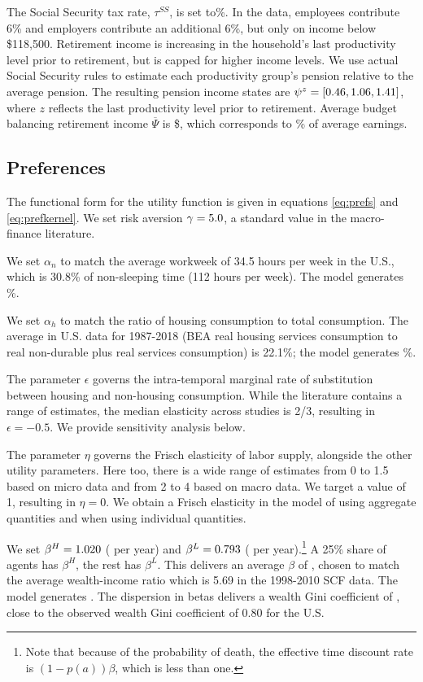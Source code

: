 \documentclass[letterpaper,12pt,dvipsnames,usenames]{article}
\theoremstyle{definition}
\begin{document}
\begin{spacing}{1.25}
The Social Security tax rate, $\tau^{SS}$, is set to{\taxssper}\%. In the data, employees contribute 6\% and employers contribute an additional 6\%, but only on income below \$118,500. Retirement income is increasing in the household's last productivity level prior to retirement, but is capped for higher income levels.  We use actual Social Security rules to estimate each productivity group's pension relative to the average pension.  The resulting pension income states are $\psi^{z}= [{0.46},{1.06},{1.41}]$, where $z$ reflects the last productivity level prior to retirement. Average budget balancing retirement income $\overline{\Psi}$ is \${\RetInc}, which corresponds to {\RetIncbyLabInc}\% of average earnings.



\subsection{Preferences}
The functional form for the utility function is given in equations \eqref{eq:prefs} and \eqref{eq:prefkernel}. We set risk aversion $\gamma={5.0}$, a standard value in the macro-finance literature.

We set $\alpha_{n}$ to match the average workweek of 34.5 hours per week in the U.S., which is 30.8\% of non-sleeping time (112 hours per week).
The model generates {\AvgHours} \%.

We set $\alpha_{h}$ to match the ratio of housing consumption to total consumption. The average in U.S. data for 1987-2018 (BEA real housing services consumption to real non-durable plus real services consumption) is 22.1\%; the model generates {\HousTotConsratio}\%.

The parameter $\epsilon$ governs the intra-temporal marginal rate of substitution between housing and non-housing consumption. While the literature contains a range of estimates, the median elasticity across studies is 2/3, resulting in $\epsilon=-0.5$. We provide sensitivity analysis below.

The parameter $\eta$ governs the Frisch elasticity of labor supply, alongside the other utility parameters. Here too, there is a wide range of estimates from 0 to 1.5 based on micro data and from 2 to 4 based on macro data. We target a value of 1, resulting in $\eta = 0$. We obtain a Frisch elasticity in the model of {\FrischEMacro} using aggregate quantities and {\FrischEMicro} when using individual quantities.

We set $\beta^H={1.020}$ ({\PbetaHy} per year) and $\beta^L={0.793}$ ({\PbetaLy} per year).\footnote{ Note that because of the probability of death, the effective time discount rate is $(1-p(a))\beta$, which is less than one.} A 25\% share of agents has $\beta^H$, the rest has $\beta^L$. This delivers an average $\beta$ of {\Pbeta}, chosen to match the average wealth-income ratio which is 5.69 in the 1998-2010 SCF data. The model generates {\NWbyInc}. The dispersion in betas delivers a wealth Gini coefficient of {\GiniNW}, close to the observed wealth Gini coefficient of 0.80 for the U.S.


\end{spacing}
\end{document}
